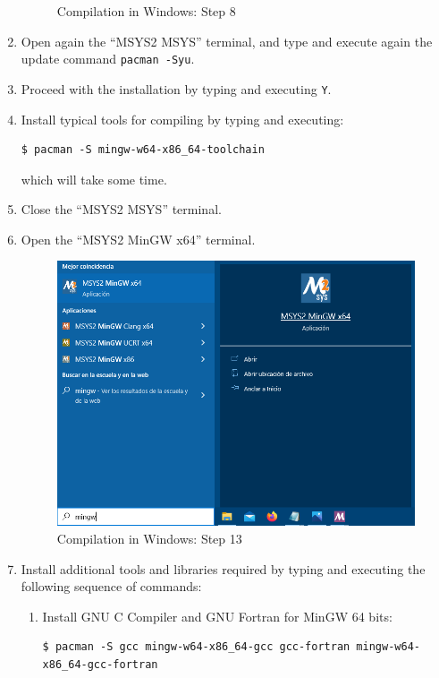 \documentclass[a4paper,fleqn]{book}
\begin{document}
\begin{enumerate}
\begin{figure}[h]
  \caption{Compilation in Windows: Step 8}
  \label{fig:windows_compilation_02}
  \end{figure} 
  \item Open again the ``MSYS2 MSYS'' terminal, and type and execute again the update command \texttt{pacman -Syu}.
  \item Proceed with the installation by typing and executing \texttt{Y}. 
  \item Install typical tools for compiling by typing and executing:
\begin{Verbatim}[frame=single, fontsize=\small]
$ pacman -S mingw-w64-x86_64-toolchain 
\end{Verbatim}
which will take some time.
  \item Close the ``MSYS2 MSYS'' terminal.
  \item Open the ``MSYS2  MinGW x64'' terminal. 
  \begin{figure}[h]
  \centering
  \includegraphics[scale=0.5]{figures/windows_compilation_09.png}
  \caption{Compilation in Windows: Step 13}
  \label{fig:windows_compilation_09}
  \end{figure} 
  \item Install additional tools and libraries required by typing and executing the following sequence of commands:
  \begin{enumerate}
    \item Install GNU C Compiler and GNU Fortran for MinGW 64 bits:
\begin{Verbatim}[frame=single, fontsize=\small]
$ pacman -S gcc mingw-w64-x86_64-gcc gcc-fortran mingw-w64-x86_64-gcc-fortran
\end{Verbatim}

\end{enumerate}
\end{enumerate}
\end{document}
